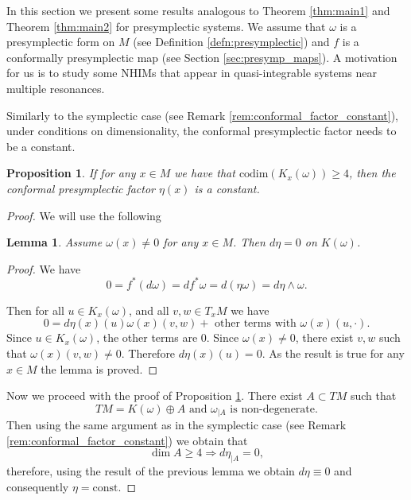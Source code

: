 \documentclass[11pt]{amsart}
\newtheorem{lem}[thm]{Lemma}
\newtheorem{prop}[thm]{Proposition}
\theoremstyle{definition}
\theoremstyle{remark}
\numberwithin{equation}{section}
\begin{document}
In this section we present some results analogous to Theorem \ref{thm:main1} and  Theorem \ref{thm:main2} for presymplectic systems.
We assume that $\omega$ is a presymplectic form on $M$ (see Definition \ref{defn:presymplectic}) and $f$ is a conformally presymplectic map (see Section \ref{sec:presymp_maps}).
A motivation for us is to study some NHIMs that appear in quasi-integrable systems near multiple  resonances.

Similarly to the symplectic case (see Remark \ref{rem:conformal_factor_constant}), under conditions on dimensionality, the conformal presymplectic factor needs to be a constant.

\begin{prop}\label{prop:conformal_factor_constant}
If  for any $x\in M$ we have that $\textrm{codim}(K_x(\omega))\ge 4$, then the conformal presymplectic factor $\eta(x)$ is a constant.
\end{prop}

\begin{proof}
We will use the following


\begin{lem}\label{lem:conformal_factor_constant}
Assume $\omega(x)\neq 0$ for any $x\in M$.
Then $d\eta =0$ on $K(\omega)$.
\end{lem}


\begin{proof}
We have
\[
0=f^*(d\omega)=d f^*\omega=d(\eta\omega)=d\eta\wedge \omega.
\]

Then for all $u\in K_x(\omega)$, and all $v,w\in T_xM$ we have
\[
0=d\eta(x)(u)\omega (x)(v,w)+\textrm{ other terms with }\omega (x)(u,\cdot).
\]
Since $u\in K_x(\omega)$, the other terms are $0$.
Since  $\omega(x) \neq 0$, there exist $v,w$ such that $\omega(x)(v,w)\neq 0$.
Therefore $d\eta (x) (u)=0$.
As the result is true for any $x\in M$ the lemma is proved.
\end{proof}


Now we proceed with the proof of Proposition \ref{prop:conformal_factor_constant}.
There exist $A\subset TM$ such that \[TM=K(\omega)\oplus A \textrm { and } \omega_{\mid A} \textrm { is non-degenerate.}\]
Then using the same argument as in the symplectic case  (see Remark \ref{rem:conformal_factor_constant}) we obtain that
\[
\dim A\ge 4 \Rightarrow d\eta_{\mid A}=0,
\]
therefore, using the result of the previous lemma we obtain  $d\eta \equiv 0$ and consequently $\eta=\textrm{const.}$
\end{proof}
\end{document}

